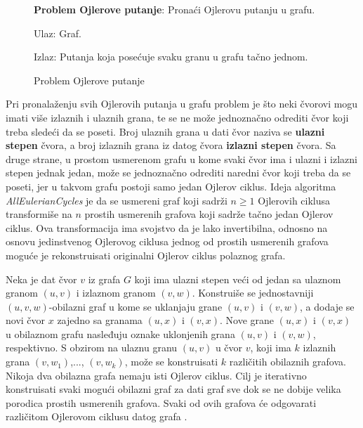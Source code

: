 \documentclass[12pt,oneside]{memoir}
\begin{document}
\begin{figure}[!ht]
\begin{tcolorbox}
\textbf{Problem Ojlerove putanje}: Pronaći Ojlerovu putanju u grafu.

Ulaz: Graf.

Izlaz: Putanja koja posećuje svaku granu u grafu tačno jednom.
\end{tcolorbox}
\caption{Problem Ojlerove putanje}
\label{box:Ojler}
\end{figure}

Pri pronalaženju svih Ojlerovih putanja u grafu problem je što neki čvorovi mogu imati više izlaznih i ulaznih grana, te se ne može jednoznačno odrediti čvor koji treba sledeći da se poseti. Broj ulaznih grana u dati čvor naziva se \textbf{ulazni stepen} čvora, a broj izlaznih grana iz datog čvora \textbf{izlazni stepen} čvora. Sa druge strane, u prostom usmerenom grafu u kome svaki čvor ima i ulazni i izlazni stepen jednak jedan, može se jednoznačno odrediti naredni čvor koji treba da se poseti, jer u takvom grafu postoji samo jedan Ojlerov ciklus. Ideja algoritma \textit{AllEulerianCycles} je da se usmereni graf koji sadrži $n \geq 1$ Ojlerovih ciklusa transformiše na $n$ prostih usmerenih grafova koji sadrže tačno jedan Ojlerov ciklus. Ova transformacija ima svojstvo da je lako invertibilna, odnosno na osnovu jedinstvenog Ojlerovog ciklusa jednog od prostih usmerenih grafova moguće je rekonstruisati originalni Ojlerov ciklus polaznog grafa.

Neka je dat čvor $v$ iz grafa $G$ koji ima ulazni stepen veći od jedan sa ulaznom granom $(u, v)$ i izlaznom granom $(v, w)$. Konstruiše se jednostavniji $(u, v, w)$-obilazni graf u kome se uklanjaju grane $(u, v)$ i $(v, w)$, a dodaje se novi čvor $x$ zajedno sa granama $(u, x)$ i $(v, x)$. Nove grane $(u, x)$ i $(v, x)$ u obilaznom grafu nasleđuju oznake uklonjenih grana $(u, v)$ i $(v, w)$, respektivno. S obzirom na ulaznu granu $(u, v)$ u čvor $v$, koji ima $k$ izlaznih grana $(v, w_1)$,..., $(v, w_k)$, može se konstruisati $k$ različitih obilaznih grafova. Nikoja dva obilazna grafa nemaju isti Ojlerov ciklus. Cilj je iterativno konstruisati svaki mogući obilazni graf za dati graf sve dok se ne dobije velika porodica prostih usmerenih grafova. Svaki od ovih grafova će odgovarati različitom Ojlerovom ciklusu datog grafa \cite{bioinformaticsAlg}.
\end{document}
